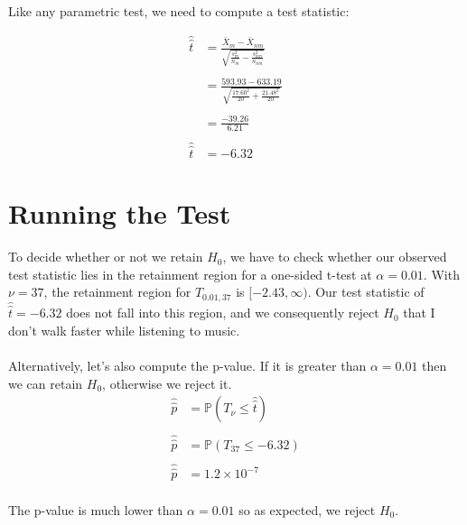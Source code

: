 \documentclass[11pt]{article}
\begin{document}
Like any parametric test, we need to compute a test statistic:

\begin{equation*}
\begin{split}
    \hat{\hat{t}} & = \frac{\bar{X}_m - \bar{X}_{nm}}{\sqrt{\frac{s^2_m}{n_m} - \frac{s^2_{nm}}{n_{nm}}}} \\ \\
    & = \frac{593.93 - 633.19}{\sqrt{\frac{17.60^2}{20}+ \frac{21.48^2}{20}}} \\ \\
    & = \frac{-39.26}{6.21} \\ \\
    \hat{\hat{t}} & = -6.32
\end{split}
\end{equation*}

\section{Running the Test}
To decide whether or not we retain $H_0$,  we have to check whether our observed test statistic lies in the retainment region for a one-sided t-test at $\alpha = 0.01$. With $\nu = 37$, the retainment region for $T_{0.01, 37}$ is $[-2.43, \infty)$. Our test statistic of $\hat{\hat{t}} = -6.32$ does not fall into this region, and we consequently reject $H_0$ that I don't walk faster while listening to music. \\ \\
Alternatively, let's also compute the p-value. If it is greater than $\alpha = 0.01$ then we can retain $H_0$, otherwise we reject it. 
\begin{equation*}
\begin{split}
    \hat{\hat{p}} &= \mathbb{P}(T_\nu \leq \hat{\hat{t}}) \\ \\
    \hat{\hat{p}} & = \mathbb{P}(T_{37} \leq -6.32) \\ \\
    \hat{\hat{p}} & = 1.2 \times 10^{-7}
\end{split}
\end{equation*} \\
The p-value is much lower than $\alpha = 0.01$ so as expected, we reject $H_0$.
\end{document}
